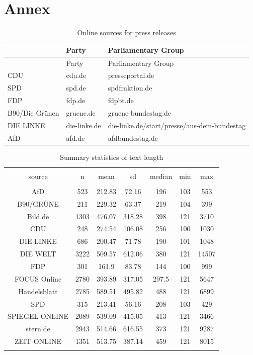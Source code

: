 \documentclass[
]{article}
\begin{document}
\hypertarget{annex}{%
\section{Annex}\label{annex}}

\begin{longtable}[]{@{}lll@{}}
\caption{Online sources for press releases
\label{table:press_releases_sources}}\tabularnewline
\toprule
& Party & Parliamentary Group\tabularnewline
\midrule
\endfirsthead
\toprule
& Party & Parliamentary Group\tabularnewline
\midrule
\endhead
CDU & cdu.de & presseportal.de\tabularnewline
SPD & spd.de & spdfraktion.de\tabularnewline
FDP & fdp.de & fdpbt.de\tabularnewline
B90/Die Grünen & gruene.de & gruene-bundestag.de\tabularnewline
DIE LINKE & die-linke.de &
die-linke.de/start/presse/aus-dem-bundestag\tabularnewline
AfD & afd.de & afdbundestag.de\tabularnewline
\bottomrule
\end{longtable}

\begin{table}[!htbp] \centering 
  \caption{Summary statistics of text length} 
  \label{table:text_length} 
\begin{tabular}{@{\extracolsep{5pt}} ccccccc} 
\\[-1.8ex]\hline 
\hline \\[-1.8ex] 
source & n & mean & sd & median & min & max \\ 
\hline \\[-1.8ex] 
AfD & 523 & 212.83 & 72.16 & 196 & 103 & 553 \\ 
B90/GRÜNE & 211 & 229.32 & 63.37 & 219 & 104 & 399 \\ 
Bild.de & 1303 & 476.07 & 318.28 & 398 & 121 & 3710 \\ 
CDU & 248 & 274.54 & 106.08 & 256 & 100 & 1030 \\ 
DIE LINKE & 686 & 200.47 & 71.78 & 190 & 101 & 1048 \\ 
DIE WELT & 3222 & 509.57 & 612.06 & 380 & 121 & 14507 \\ 
FDP & 301 & 161.9 & 83.78 & 144 & 100 & 999 \\ 
FOCUS Online & 2780 & 393.89 & 317.05 & 297.5 & 121 & 5647 \\ 
Handelsblatt & 2785 & 589.51 & 495.82 & 488 & 121 & 6899 \\ 
SPD & 315 & 213.41 & 56.16 & 208 & 103 & 429 \\ 
SPIEGEL ONLINE & 2089 & 539.09 & 415.05 & 413 & 121 & 3466 \\ 
stern.de & 2943 & 514.66 & 616.55 & 373 & 121 & 9287 \\ 
ZEIT ONLINE & 1351 & 513.75 & 387.14 & 459 & 121 & 8015 \\ 
\hline \\[-1.8ex] 
\end{tabular} 
\end{table}
\end{document}
